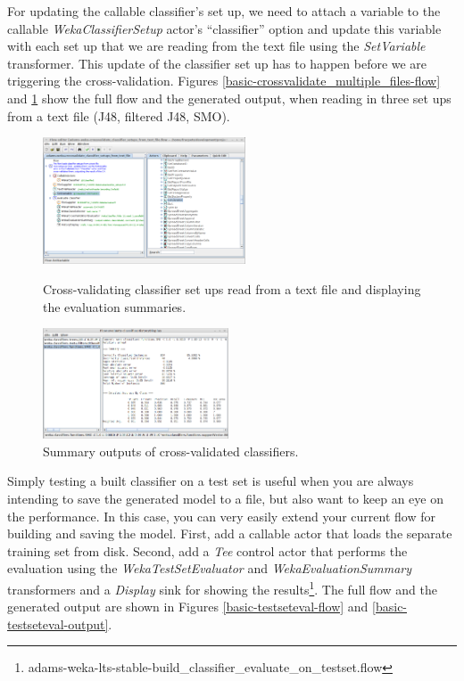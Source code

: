 For updating the callable classifier's set up, we need to attach a variable to the
callable \textit{WekaClassifierSetup} actor's ``classifier'' option and update this
variable with each set up that we are reading from the text file using the
\textit{SetVariable} transformer. This update of the classifier set up has to
happen before we are triggering the cross-validation. Figures
\ref{basic-crossvalidate_multiple_files-flow} and
\ref{basic-crossvalidate_multiple_files-output} show the full flow and the
generated output, when reading in three set ups from a text file (J48,
filtered J48, SMO).

\begin{figure}[ht]
  \begin{minipage}[t]{0.5\linewidth}
    \centering
    \includegraphics[width=6.0cm]{images/basic-crossvalidate_multiple_files-flow.png}
    \caption{Cross-validating classifier set ups read from a text file and
    displaying the evaluation summaries.}
    \label{basic-crossvalidate_multiple_files-flow}
  \end{minipage}
  \hspace{0.5cm}
  \begin{minipage}[t]{0.5\linewidth}
    \centering
    \includegraphics[width=5.5cm]{images/basic-crossvalidate_multiple_files-output.png}
    \caption{Summary outputs of cross-validated classifiers.}
    \label{basic-crossvalidate_multiple_files-output}
  \end{minipage}
\end{figure}

Simply testing a built classifier on a test set is useful when you are always
intending to save the generated model to a file, but also want to keep an eye on
the performance. In this case, you can very easily extend your current flow for
building and saving the model. First, add a callable actor that loads the separate
training set from disk. Second, add a \textit{Tee} control actor that performs
the evaluation using the \textit{WekaTestSetEvaluator} and
\textit{WekaEvaluationSummary} transformers and a \textit{Display} sink for
showing the
results\footnote{adams-weka-lts-stable-build\_classifier\_evaluate\_on\_testset.flow}. The
full flow and the generated output are shown in Figures
\ref{basic-testseteval-flow} and \ref{basic-testseteval-output}.

